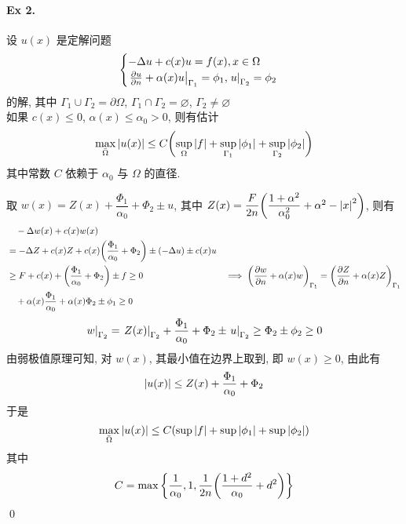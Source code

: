 \paragraph{Ex 2.}
设 $u(x)$ 是定解问题
\[ \begin{cases}
-\Delta u + c(x) u = f(x), x \in \Omega \\
{\left.{{\frac{\partial {u}}{\partial {n}}} + \alpha(x)u} \right|}_{\Gamma_1} = \phi_1,
{\left.{u} \right|}_{\Gamma_2} = \phi_2
\end{cases} \]
的解, 其中 $\Gamma_1 \cup \Gamma_2 = \partial\Omega$,
$\Gamma_1 \cap \Gamma_2 = \varnothing$, $\Gamma_2 \neq \varnothing$ \\
如果 $c(x) \leq 0$, $\alpha(x) \leq \alpha_0 > 0$, 则有估计
\[ \max_{\bar\Omega} {\lvert {u(x)} \rvert} \leq C{\left( {
    \sup_{\Omega}{\lvert {f} \rvert}+\sup_{\Gamma_1}{\lvert {\phi_1} \rvert}+\sup_{\Gamma_2}{\lvert {\phi_2} \rvert}
} \right)} \]
其中常数 $C$ 依赖于 $\alpha_0$ 与 $\Omega$ 的直径.

\begin{solution}
取 $w(x) = Z(x) + \dfrac{\Phi_1}{\alpha_0} + \Phi_2 \pm u$, 其中
$Z(x)=\dfrac F{2n}{\left( {\dfrac{1+\alpha^2}{\alpha_0^2}+\alpha^2-{\lvert {x} \rvert}^2} \right)}$,
则有 
\begin{align*}
&\quad-\Delta w(x) + c(x)w(x) \\
&= -\Delta Z + c(x)Z + c(x) \biggl( \dfrac{\Phi_1}{\alpha_0} + \Phi_2 \biggr)
    \pm (-\Delta u) \pm c(x)u \\
&\geq F + c(x) + \biggl( \dfrac{\Phi_1}{\alpha_0} + \Phi_2 \biggr) \pm f \geq 0
&\implies {\left( {{\frac{\partial {w}}{\partial {n}}}+\alpha(x)w} \right)}_{\Gamma_1}
    = {\left( {{\frac{\partial {Z}}{\partial {n}}}+\alpha(x)Z} \right)}_{\Gamma_1} \\
    &\quad+ \alpha(x)\frac{\Phi_1}{\alpha_0} + \alpha(x)\Phi_2 \pm \phi_1 \geq 0
\end{align*}
\[
{\left.{w} \right|}_{\Gamma_2}={\left.{Z(x)} \right|}_{\Gamma_2}+\frac{\Phi_1}{\alpha_0}+\Phi_2
\pm {\left.{u} \right|}_{\Gamma_2} \geq \Phi_2 \pm \phi_2 \geq 0
\]
由弱极值原理可知, 对 $w(x)$, 其最小值在边界上取到, 即 $w(x) \geq 0$, 由此有
\[{\lvert {u(x)} \rvert} \leq Z(x) + \frac{\Phi_1}{\alpha_0} + \Phi_2\]
于是
\[\max_{\bar\Omega} {\lvert {u(x)} \rvert} \leq C{\left( {
    \sup{\lvert {f} \rvert}+\sup{\lvert {\phi_1} \rvert}+\sup{\lvert {\phi_2} \rvert}
} \right)} \]
其中
\[ C = \max{\left\{ {
    \frac 1{\alpha_0}, 1, \frac 1{2n}{\left( {\frac{1+d^2}{\alpha_0} + d^2} \right)}
} \right\}} \]
\qed
\end{solution}
